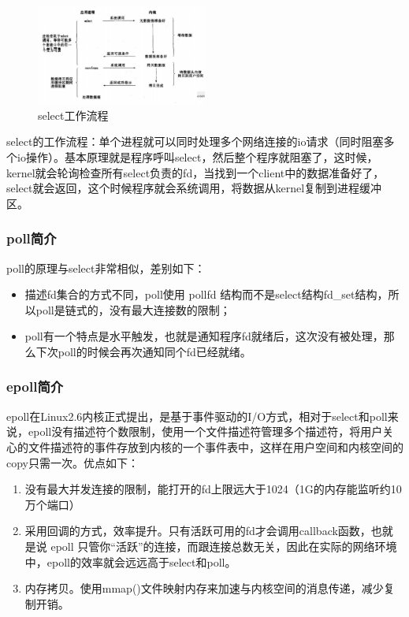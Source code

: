 \documentclass{article}
\begin{document}
\begin{figure}[ht]
    \centering
    \includegraphics[width=0.5\textwidth]{img/select.png}
    \caption{select工作流程}
\end{figure}

select的工作流程：单个进程就可以同时处理多个网络连接的io请求（同时阻塞多个io操作）。基本原理就是程序呼叫select，然后整个程序就阻塞了，这时候，kernel就会轮询检查所有select负责的fd，当找到一个client中的数据准备好了，select就会返回，这个时候程序就会系统调用，将数据从kernel复制到进程缓冲区。

\subsubsection{poll简介}
poll的原理与select非常相似，差别如下：
\begin{itemize}
    \item 描述fd集合的方式不同，poll使用 pollfd 结构而不是select结构fd\_set结构，所以poll是链式的，没有最大连接数的限制；
    \item poll有一个特点是水平触发，也就是通知程序fd就绪后，这次没有被处理，那么下次poll的时候会再次通知同个fd已经就绪。
\end{itemize}

\subsubsection{epoll简介}
epoll在Linux2.6内核正式提出，是基于事件驱动的I/O方式，相对于select和poll来说，epoll没有描述符个数限制，使用一个文件描述符管理多个描述符，将用户关心的文件描述符的事件存放到内核的一个事件表中，这样在用户空间和内核空间的copy只需一次。优点如下：
\begin{enumerate}
    \item 没有最大并发连接的限制，能打开的fd上限远大于1024（1G的内存能监听约10万个端口）
    \item 采用回调的方式，效率提升。只有活跃可用的fd才会调用callback函数，也就是说 epoll 只管你“活跃”的连接，而跟连接总数无关，因此在实际的网络环境中，epoll的效率就会远远高于select和poll。
    \item 内存拷贝。使用mmap()文件映射内存来加速与内核空间的消息传递，减少复制开销。
\end{enumerate}
\end{document}
